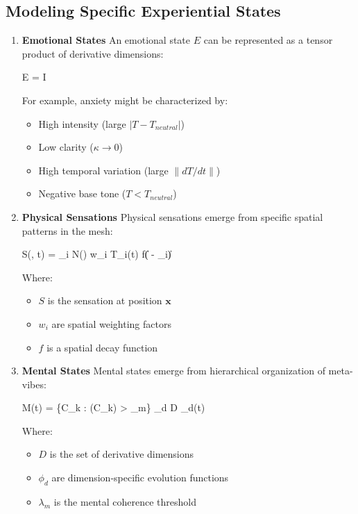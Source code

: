 \documentclass{article}
\let\oldequation\equation
\let\endoldequation\endequation
\renewenvironment{equation}{%
    \noindent\vspace{-\parskip}\vspace{-\baselineskip}%
    \oldequation
}{%
    \endoldequation
    \noindent\vspace{-\parskip}\vspace{-\baselineskip}%
}
\theoremstyle{definition}
\theoremstyle{axiom}
\theoremstyle{theorem}
\theoremstyle{proposition}
\begin{document}
\subsection{Modeling Specific Experiential States}

\begin{enumerate}
\item \textbf{Emotional States} An emotional state $E$ can be represented as a tensor product of derivative dimensions:

\begin{equation}
E = I \otimes \kappa \otimes \Xi \otimes {}
\end{equation}

For example, anxiety might be characterized by:
\begin{itemize}
\item High intensity (large $|T - T_{neutral}|$)
\item Low clarity ($\kappa \to 0$)
\item High temporal variation (large $\|dT/dt\|$)
\item Negative base tone ($T < T_{neutral}$)
\end{itemize}

\item \textbf{Physical Sensations} Physical sensations emerge from specific spatial patterns in the mesh:

\begin{equation}
S(, t) = \sum_{i \in N()} w_i T_i(t) f(\| - _i\|)
\end{equation}

Where:
\begin{itemize}
\item $S$ is the sensation at position $\mathbf{x}$
\item $w_i$ are spatial weighting factors
\item $f$ is a spatial decay function
\end{itemize}

\item \textbf{Mental States} Mental states emerge from hierarchical organization of meta-vibes:

\begin{equation}
M(t) = \{C_k : (C_k) > \lambda_m\} \times \prod_{d \in D} \phi_d(t)
\end{equation}

Where:
\begin{itemize}
\item $D$ is the set of derivative dimensions
\item $\phi_d$ are dimension-specific evolution functions
\item $\lambda_m$ is the mental coherence threshold
\end{itemize}
\end{enumerate}
\end{document}
